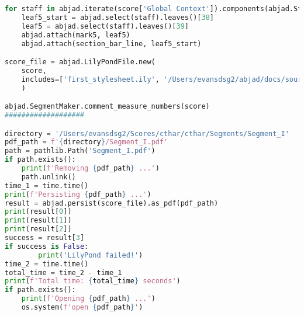 \begin{lstlisting}[language=Python, caption=Cthar Segment\_I]
for staff in abjad.iterate(score['Global Context']).components(abjad.Staff):
    leaf5_start = abjad.select(staff).leaves()[38]
    leaf5 = abjad.select(staff).leaves()[39]
    abjad.attach(mark5, leaf5)
    abjad.attach(section_bar_line, leaf5_start)

score_file = abjad.LilyPondFile.new(
    score,
    includes=['first_stylesheet.ily', '/Users/evansdsg2/abjad/docs/source/_stylesheets/abjad.ily'],
    )

abjad.SegmentMaker.comment_measure_numbers(score)
###################

directory = '/Users/evansdsg2/Scores/cthar/cthar/Segments/Segment_I'
pdf_path = f'{directory}/Segment_I.pdf'
path = pathlib.Path('Segment_I.pdf')
if path.exists():
    print(f'Removing {pdf_path} ...')
    path.unlink()
time_1 = time.time()
print(f'Persisting {pdf_path} ...')
result = abjad.persist(score_file).as_pdf(pdf_path)
print(result[0])
print(result[1])
print(result[2])
success = result[3]
if success is False:
        print('LilyPond failed!')
time_2 = time.time()
total_time = time_2 - time_1
print(f'Total time: {total_time} seconds')
if path.exists():
    print(f'Opening {pdf_path} ...')
    os.system(f'open {pdf_path}')
\end{lstlisting}
\doublespace



